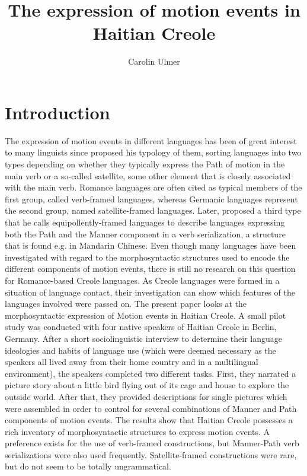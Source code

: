 \documentclass[output=paper,colorlinks,citecolor=brown]{langscibook}
\author{Carolin Ulmer\orcid{}\affiliation{Freie Universität Berlin}}
\title{The expression of motion events in Haitian Creole}
\begin{document}
\maketitle

\section{Introduction}

The expression of motion events in different languages has been of great interest to many linguists since \citet{Talmy_1991} proposed his typology of them, sorting languages into two types depending on whether they typically express the Path of motion in the main verb or a so-called satellite, some other element that is closely associated with the main verb. Romance languages are often cited as typical members of the first group, called verb-framed languages, whereas Germanic languages represent the second group, named satellite-framed languages. Later, \citet{Slobin_2004} proposed a third type that he calls equipollently-framed languages to describe languages expressing both the Path and the Manner component in a verb serialization, a structure that is found e.g. in Mandarin Chinese. Even though many languages have been investigated with regard to the morphosyntactic structures used to encode the different components of motion events, there is still no research on this question for Romance-based Creole languages. As Creole languages were formed in a situation of language contact, their investigation can show which features of the languages involved were passed on. The present paper looks at the morphosyntactic expression of Motion events in Haitian Creole. A small pilot study was conducted with four native speakers of Haitian Creole in Berlin, Germany. After a short sociolinguistic interview to determine their language ideologies and habits of language use (which were deemed necessary as the speakers all lived away from their home country and in a multilingual environment), the speakers completed two different tasks. First, they narrated a picture story about a little bird flying out of its cage and house to explore the outside world. After that, they provided descriptions for single pictures which were assembled in order to control for several combinations of Manner and Path components of motion events. The results show that Haitian Creole possesses a rich inventory of morphosyntactic structures to express motion events. A preference exists for the use of verb-framed constructions, but Manner-Path verb serializations were also used frequently. Satellite-framed constructions were rare, but do not seem to be totally ungrammatical.
\end{document}
